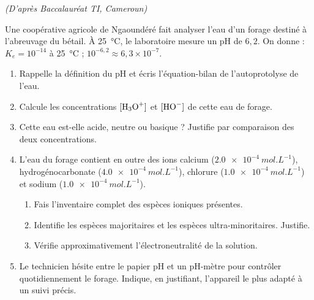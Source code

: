 \documentclass[11pt]{article}
\begin{document}
\begin{exercice}
\textit{(D'après Baccalauréat TI, Cameroun)}

Une coopérative agricole de Ngaoundéré fait analyser l'eau d'un forage destiné à l'abreuvage du bétail. À \SI{25}{\celsius}, le laboratoire mesure un pH de $6{,}2$. On donne : $K_e = 10^{-14}$ à \SI{25}{\celsius} ; $10^{-6{,}2} \approx 6{,}3 \times 10^{-7}$.
\begin{enumerate}
\item Rappelle la définition du pH et écris l'équation-bilan de l'autoprotolyse de l'eau.
\item Calcule les concentrations $[\ce{H3O+}]$ et $[\ce{HO-}]$ de cette eau de forage.
\item Cette eau est-elle acide, neutre ou basique ? Justifie par comparaison des deux concentrations.
\item L'eau du forage contient en outre des ions calcium  ($\SI{2,0e-4}{mol.L^{-1}}$), hydrogénocarbonate  ($\SI{4,0e-4}{mol.L^{-1}}$), chlorure  ($\SI{1,0e-4}{mol.L^{-1}}$) et sodium  ($\SI{1,0e-4}{mol.L^{-1}}$).
\begin{enumerate}
\item Fais l'inventaire complet des espèces ioniques présentes.
\item Identifie les espèces majoritaires et les espèces ultra-minoritaires. Justifie.
\item Vérifie approximativement l'électroneutralité de la solution.
\end{enumerate}
\item Le technicien hésite entre le papier pH et un pH-mètre pour contrôler quotidiennement le forage. Indique, en justifiant, l'appareil le plus adapté à un suivi précis.
\end{enumerate}
\end{exercice}
\end{document}
